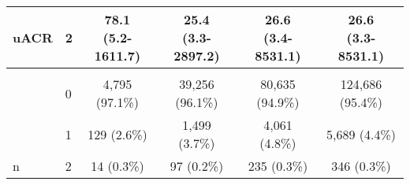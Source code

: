 \begin{table}[!ht]
\begin{tabular}[t]{llcccc}
\multirow{-3}{*}{uACR} & 2 & \makecell{78.1 \\ (5.2-1611.7)} & \makecell{25.4 \\ (3.3-2897.2)} & \makecell{26.6 \\ (3.4-8531.1)} & \makecell{26.6 \\ (3.3-8531.1)} \\
\midrule\midrule \\
 & 0 & 4,795 (97.1\%) & 39,256 (96.1\%) & 80,635 (94.9\%) & 124,686 (95.4\%) \\
 & 1 & 129 (2.6\%) & 1,499 (3.7\%) & 4,061 (4.8\%) & 5,689 (4.4\%) \\
\multirow{-3}{*}{n}  & 2 & 14 (0.3\%) & 97 (0.2\%) & 235 (0.3\%) & 346 (0.3\%) \\
\bottomrule
\end{tabular}
\normalsize
\end{table}
